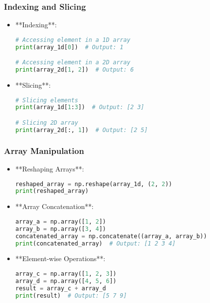 \documentclass[aspectratio=169]{beamer}
\begin{document}
\begin{frame}[fragile]
    \frametitle{Indexing and Slicing}
    \begin{itemize}
        \item **Indexing**:
        \begin{lstlisting}[language=Python]
# Accessing element in a 1D array
print(array_1d[0])  # Output: 1

# Accessing element in a 2D array
print(array_2d[1, 2])  # Output: 6
        \end{lstlisting}
        
        \item **Slicing**:
        \begin{lstlisting}[language=Python]
# Slicing elements
print(array_1d[1:3])  # Output: [2 3]

# Slicing 2D array
print(array_2d[:, 1])  # Output: [2 5]
        \end{lstlisting}
    \end{itemize}
\end{frame}

\begin{frame}[fragile]
    \frametitle{Array Manipulation}
    \begin{itemize}
        \item **Reshaping Arrays**:
        \begin{lstlisting}[language=Python]
reshaped_array = np.reshape(array_1d, (2, 2))
print(reshaped_array)
        \end{lstlisting}
        
        \item **Array Concatenation**:
        \begin{lstlisting}[language=Python]
array_a = np.array([1, 2])
array_b = np.array([3, 4])
concatenated_array = np.concatenate((array_a, array_b))
print(concatenated_array)  # Output: [1 2 3 4]
        \end{lstlisting}
        
        \item **Element-wise Operations**:
        \begin{lstlisting}[language=Python]
array_c = np.array([1, 2, 3])
array_d = np.array([4, 5, 6])
result = array_c + array_d
print(result)  # Output: [5 7 9]
        \end{lstlisting}
    \end{itemize}
\end{frame}
\end{document}
